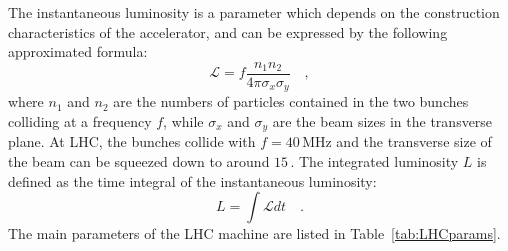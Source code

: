 The instantaneous luminosity is a parameter which depends on the construction characteristics of the accelerator, and can be expressed by the following approximated formula:
\begin{equation}
\mathcal{L} = f\frac{n_1 n_2}{4\pi\sigma_x\sigma_y} \quad ,
\end{equation}
where $n_1$ and $n_2$ are the numbers of particles contained in the two bunches colliding at a frequency $f$, while $\sigma_x$ and $\sigma_y$ are the beam sizes in the transverse plane. At LHC, the bunches collide with $f=40$\,MHz and the transverse size of the beam can be squeezed down to around $15$\,\micron.
The integrated luminosity $L$ is defined as the time integral of the instantaneous luminosity:
\begin{equation}
L = \int \mathcal{L} dt \quad .
\end{equation}
The main parameters of the LHC machine are listed in Table~\ref{tab:LHCparams}.

